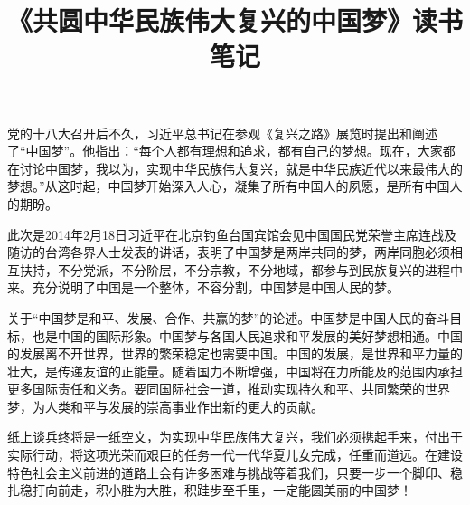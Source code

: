 \documentclass[UTF-8, a4paper]{ctexart}
\title{《共圆中华民族伟大复兴的中国梦》读书笔记}
\author{}
\date{}
\begin{document}
	\maketitle
	党的十八大召开后不久，习近平总书记在参观《复兴之路》展览时提出和阐述了“中国梦”。他指出：“每个人都有理想和追求，都有自己的梦想。现在，大家都在讨论中国梦，我以为，实现中华民族伟大复兴，就是中华民族近代以来最伟大的梦想。”从这时起，中国梦开始深入人心，凝集了所有中国人的夙愿，是所有中国人的期盼。
	
	此次是2014年2月18日习近平在北京钓鱼台国宾馆会见中国国民党荣誉主席连战及随访的台湾各界人士发表的讲话，表明了中国梦是两岸共同的梦，两岸同胞必须相互扶持，不分党派，不分阶层，不分宗教，不分地域，都参与到民族复兴的进程中来。充分说明了中国是一个整体，不容分割，中国梦是中国人民的梦。
	
	关于“中国梦是和平、发展、合作、共赢的梦”的论述。中国梦是中国人民的奋斗目标，也是中国的国际形象。中国梦与各国人民追求和平发展的美好梦想相通。中国的发展离不开世界，世界的繁荣稳定也需要中国。中国的发展，是世界和平力量的壮大，是传递友谊的正能量。随着国力不断增强，中国将在力所能及的范围内承担更多国际责任和义务。要同国际社会一道，推动实现持久和平、共同繁荣的世界梦，为人类和平与发展的崇高事业作出新的更大的贡献。
	
	纸上谈兵终将是一纸空文，为实现中华民族伟大复兴，我们必须携起手来，付出于实际行动，将这项光荣而艰巨的任务一代一代华夏儿女完成，任重而道远。在建设特色社会主义前进的道路上会有许多困难与挑战等着我们，只要一步一个脚印、稳扎稳打向前走，积小胜为大胜，积跬步至千里，一定能圆美丽的中国梦！
	
\end{document}
